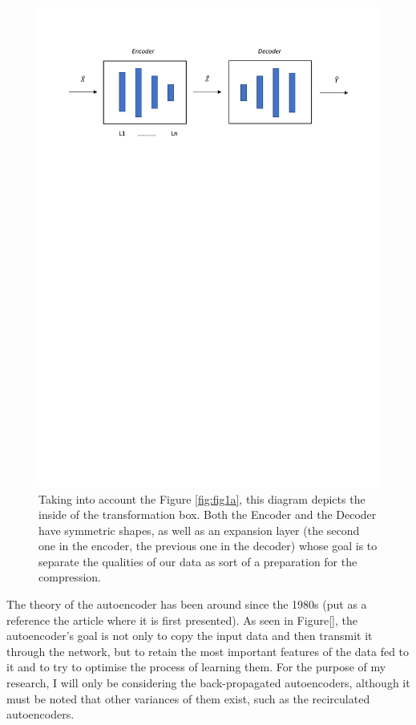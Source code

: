 \begin{figure}[H]
 \centering
  \includegraphics[width=16cm]{Figuras_tfg/Figura_autoencoder}
  \caption{Taking into account the Figure \ref{fig:fig1a}, this diagram depicts the inside of the transformation box. Both the Encoder and the Decoder have symmetric shapes, as well as an expansion layer (the second one in the encoder, the previous one in the decoder) whose goal is to separate the qualities of our data as sort of a preparation for the compression.}
 \label{fig:figure_autoencoder}
\end{figure} 

The theory of the autoencoder has been around since the 1980s (put as a reference the article where it is first presented). As seen in Figure[], the autoencoder's goal is not only to copy the input data and then transmit it through the network, but to retain the most important features of the data fed to it and to try to optimise the process of learning them. For the purpose of my research, I will only be considering the back-propagated autoencoders, although it must be noted that other variances of them exist, such as the recirculated autoencoders. \par

